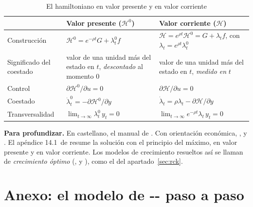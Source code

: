 \documentclass[11pt]{article}
\begin{document}
\begin{table}[H]
\centering
\caption{El hamiltoniano en valor presente y en valor corriente}\label{tab:hamiltonianos}
\small
\begin{tabular}{>{\raggedright\arraybackslash}m{2.4cm}>{\raggedright\arraybackslash}m{6cm}>{\raggedright\arraybackslash}m{6cm}}
\toprule
\rowcolor{tceeazulpalido} & \textbf{Valor presente ($\mathcal{H}^0$)} & \textbf{Valor corriente ($\mathcal{H}$)}\\
\midrule
Construcción & $\mathcal{H}^0=e^{-\rho t}G+\lambda^0_t f$ & $\mathcal{H}=e^{\rho t}\mathcal{H}^0=G+\lambda_t f$, con $\lambda_t=e^{\rho t}\lambda^0_t$\\
\addlinespace[0.3em]
Significado del coestado & valor de una unidad más del estado en $t$, \emph{descontado} al momento 0 & valor de una unidad más del estado en $t$, \emph{medido en} $t$\\
\addlinespace[0.3em]
Control & $\partial\mathcal{H}^0/\partial u=0$ & $\partial\mathcal{H}/\partial u=0$\\
\addlinespace[0.3em]
Coestado & $\dot\lambda^0_t=-\partial\mathcal{H}^0/\partial y$ & $\dot\lambda_t=\rho\lambda_t-\partial\mathcal{H}/\partial y$\\
\addlinespace[0.3em]
Transversalidad & $\lim_{t\to\infty}\lambda^0_t\,y_t=0$ & $\lim_{t\to\infty}e^{-\rho t}\lambda_t\,y_t=0$\\
\bottomrule
\end{tabular}
\end{table}

\begin{anotaciones}
\textbf{Para profundizar.} En castellano, el manual de \textcite{Cerda2001Optimizacion}. Con orientación económica, \textcite{Acemoglu2009}, \textcite{Heijdra2009Foundations} y \textcite{ObstfeldRogoff1996Foundations}. El apéndice 14.1~de \textcite{PermanEtAl2011Natural} resume la solución con el principio del máximo, en valor presente y en valor corriente. Los modelos de crecimiento resueltos así se llaman de \emph{crecimiento óptimo} (,  y ), como el del apartado~\ref{sec:rck}.
\end{anotaciones}

\section{Anexo: el modelo de -- paso a paso}\label{anexo:rck}
\end{document}

